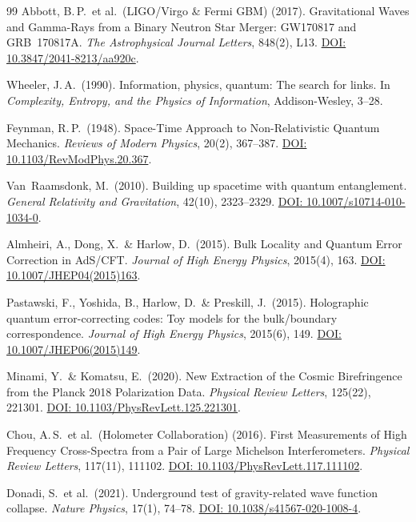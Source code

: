 \documentclass[aps,prd,twocolumn,superscriptaddress,nofootinbib]{revtex4-2}
\begin{document}
\begin{thebibliography}{99}
Abbott, B.\,P.\ et al.\ (LIGO/Virgo \& Fermi GBM) (2017).
Gravitational Waves and Gamma-Rays from a Binary Neutron Star Merger: GW170817 and GRB~170817A.
\textit{The Astrophysical Journal Letters}, 848(2), L13.
\href{https://doi.org/10.3847/2041-8213/aa920c}{DOI: 10.3847/2041-8213/aa920c}.

Wheeler, J.\,A.\ (1990).
Information, physics, quantum: The search for links.
In \textit{Complexity, Entropy, and the Physics of Information}, Addison-Wesley, 3--28.

Feynman, R.\,P.\ (1948).
Space-Time Approach to Non-Relativistic Quantum Mechanics.
\textit{Reviews of Modern Physics}, 20(2), 367--387.
\href{https://doi.org/10.1103/RevModPhys.20.367}{DOI: 10.1103/RevModPhys.20.367}.

Van~Raamsdonk, M.\ (2010).
Building up spacetime with quantum entanglement.
\textit{General Relativity and Gravitation}, 42(10), 2323--2329.
\href{https://doi.org/10.1007/s10714-010-1034-0}{DOI: 10.1007/s10714-010-1034-0}.

Almheiri, A., Dong, X.\ \& Harlow, D.\ (2015).
Bulk Locality and Quantum Error Correction in AdS/CFT.
\textit{Journal of High Energy Physics}, 2015(4), 163.
\href{https://doi.org/10.1007/JHEP04(2015)163}{DOI: 10.1007/JHEP04(2015)163}.

Pastawski, F., Yoshida, B., Harlow, D.\ \& Preskill, J.\ (2015).
Holographic quantum error-correcting codes: Toy models for the bulk/boundary correspondence.
\textit{Journal of High Energy Physics}, 2015(6), 149.
\href{https://doi.org/10.1007/JHEP06(2015)149}{DOI: 10.1007/JHEP06(2015)149}.

Minami, Y.\ \& Komatsu, E.\ (2020).
New Extraction of the Cosmic Birefringence from the Planck 2018 Polarization Data.
\textit{Physical Review Letters}, 125(22), 221301.
\href{https://doi.org/10.1103/PhysRevLett.125.221301}{DOI: 10.1103/PhysRevLett.125.221301}.

Chou, A.\,S.\ et al.\ (Holometer Collaboration) (2016).
First Measurements of High Frequency Cross-Spectra from a Pair of Large Michelson Interferometers.
\textit{Physical Review Letters}, 117(11), 111102.
\href{https://doi.org/10.1103/PhysRevLett.117.111102}{DOI: 10.1103/PhysRevLett.117.111102}.

Donadi, S.\ et al.\ (2021).
Underground test of gravity-related wave function collapse.
\textit{Nature Physics}, 17(1), 74--78.
\href{https://doi.org/10.1038/s41567-020-1008-4}{DOI: 10.1038/s41567-020-1008-4}.


\end{thebibliography}
\end{document}

